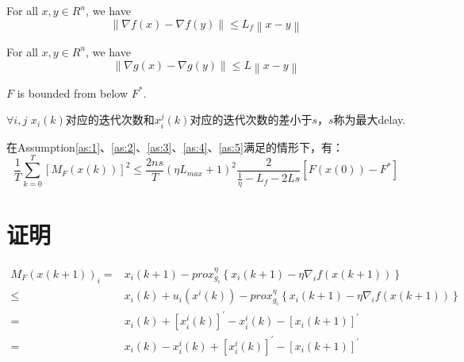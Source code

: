 \documentclass{ctexart}
\begin{document}
\begin{myas}\label{as:2}
For all $x,y \in R^n$, we have
    \begin{equation}\label{aseq:2}
      \left\| \nabla f\left(x\right) -\nabla f\left(y\right) \right\| \leq L_f \left\| x-y \right\|
    \end{equation}
\end{myas}

\begin{myas}\label{as:3}
For all $x,y \in R^n$, we have
    \begin{equation}\label{aseq:3}
      \left\| \nabla g\left(x\right) -\nabla g\left(y\right) \right\| \leq L \left\| x-y \right\|
    \end{equation}
\end{myas}

\begin{myas}\label{as:4}
    $F$ is bounded from below $F^*$.
\end{myas}

\begin{myas}\label{as:5}
    $ \forall i,j$ $ x_i \left(k\right)$对应的迭代次数和$x_i^j \left(k\right)$对应的迭代次数的差小于$s$，$s$称为最大delay.
\end{myas}

\begin{myth}\label{th:1}
    在Assumption\ref{as:1}、\ref{as:2}、\ref{as:3}、\ref{as:4}、\ref{as:5}满足的情形下，有：
    \begin{equation}\label{eq:7}
    \frac{1}{T}{\sum\limits_{k = 0}^T {\left[ {{M_F}\left( {x\left( k \right)} \right)} \right]} ^2} \leq \frac{2ns}{T}\left(\eta L_{max} + 1\right)^2 \frac{2}{\frac{1}{\eta}-L_f-2Ls} \left[F\left(x\left(0\right)\right) - F^* \right]
\end{equation}
\end{myth}

\newpage
\section{证明}

\begin{align}\label{eq:8}
  M_F\left(x\left( k+1\right)\right)_i = & x_i\left(k+1\right) - prox_{g_i}^{\eta} \left\{{x_i}\left( k+1\right) - \eta {\nabla_i}f\left( x\left(k+1\right)\right)\right\} \nonumber\\
   \leq & x_i\left( k\right) + {u_i}\left({x^i}\left(k\right)\right) - prox_{g_i}^{\eta} \left\{{x_i}\left(k+1\right) - \eta {\nabla_i}f\left({x}\left(k+1\right)\right)\right\} \nonumber\\
   = & {x_i}\left(k\right)+\left[{x_i^i}\left(k\right)\right]^{'} - {x_i^i}\left(k\right) - \left[{x_i}\left(k+1\right)\right]^{'} \nonumber \\
   = & {x_i}\left(k\right) - {x_i^i}\left(k\right) + \left[{x_i^i}\left(k\right)\right]^{'} - \left[{x_i}\left(k+1\right)\right]^{'}
\end{align}
\end{document}
